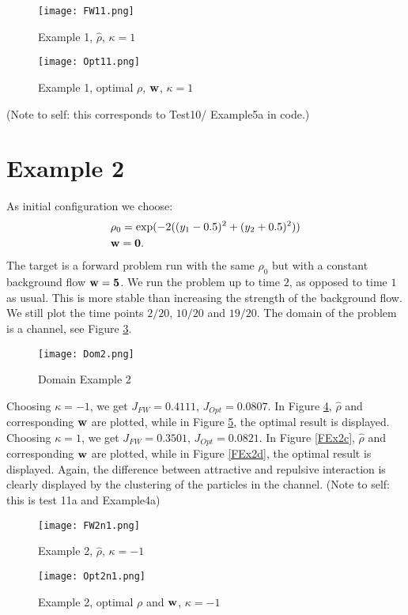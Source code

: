 \begin{figure}[h]
	\centering
	\texttt{[image: FW11.png]}
	\caption{Example 1, $\widehat \rho$, $\kappa = 1$} 
	\label{FEx1c}
\end{figure}
\begin{figure}[h]
	\centering
	\texttt{[image: Opt11.png]}
	\caption{Example 1, optimal $\rho$, $\mathbf{w}$, $\kappa = 1$} 
	\label{FEx1d}
\end{figure}
(Note to self: this corresponds to Test10/ Example5a in code.)
\section*{Example 2}
As initial configuration we choose:
\begin{align*}
&\rho_0 = \exp(-2((y_1 - 0.5 )^2 + (y_2 + 0.5)^2))\\
&\mathbf{w} = \mathbf{0}.
\end{align*}	
The target is a forward problem run with the same $\rho_0$ but with a constant background flow $\mathbf{w} = \mathbf{5}$. We run the problem up to time $2$, as opposed to time $1$ as usual. This is more stable than increasing the strength of the background flow. We still plot the time points $2/20$, $10/20$ and $19/20$. The domain of the problem is a channel, see Figure \ref{Dom2}.
\begin{figure}[h]
	\centering
	\texttt{[image: Dom2.png]}
	\caption{Domain Example 2} 
	\label{Dom2}
\end{figure}


Choosing $\kappa = -1$, we get $J_{FW} =  0.4111$, $J_{Opt} =  0.0807$. In Figure \ref{FEx2a}, $\widehat \rho$ and corresponding $\mathbf{w}$ are plotted, while in Figure \ref{FEx2b}, the optimal result is displayed. Choosing $\kappa = 1$, we get $J_{FW} =  0.3501$, $J_{Opt} =  0.0821$. In Figure \ref{FEx2c}, $\widehat \rho$ and corresponding $\mathbf{w}$ are plotted, while in Figure \ref{FEx2d}, the optimal result is displayed. Again, the difference between attractive and repulsive interaction is clearly displayed by the clustering of the particles in the channel. (Note to self: this is test 11a and Example4a) 
\begin{figure}[h]
	\centering
	\texttt{[image: FW2n1.png]}
	\caption{Example 2, $\widehat \rho$, $\kappa = -1$} 
	\label{FEx2a}
\end{figure}
\begin{figure}[h]
	\centering
	\texttt{[image: Opt2n1.png]}
	\caption{Example 2, optimal $\rho$ and $\mathbf{w}$, $\kappa = -1$} 
	\label{FEx2b}
\end{figure}

